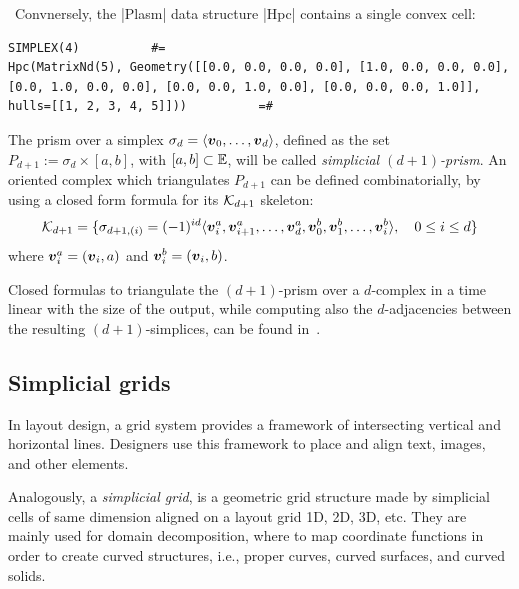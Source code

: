\begin{coding}\ 
Convnersely, the |Plasm| data structure |Hpc| contains a single convex cell:
\begin{lstlisting}[language=JuliaLocal, style=julia, mathescape = true]
SIMPLEX(4)			#=
Hpc(MatrixNd(5), Geometry([[0.0, 0.0, 0.0, 0.0], [1.0, 0.0, 0.0, 0.0], [0.0, 1.0, 0.0, 0.0], [0.0, 0.0, 1.0, 0.0], [0.0, 0.0, 0.0, 1.0]], hulls=[[1, 2, 3, 4, 5]]))			 =#
\end{lstlisting}
\end{coding}

\begin{definition}

The prism over a simplex $\sigma_{d} = \langle {\mbox{\boldmath $v$}}_{0},\ldots,
{\mbox{\boldmath $v$}}_{d} \rangle$, defined as the set $P_{d+1} := \sigma_{d} \times
[a,b]$, with $[a,b]\subset\mathbb{E}$, will be called \emph{simplicial $(d+1)$-prism}. 
An oriented complex which triangulates $P_{d+1}$ can be defined
combinatorially, by using a closed form formula for its ${\cal
K}_{d+1}$ skeleton:
\[
{\cal K}_{d+1} = \{ \sigma_{d+1,(i)} = (-1)^{id}
\langle {\mbox{\boldmath $v$}}_{i}^{a},{\mbox{\boldmath $v$}}_{i+1}^{a},\ldots,{\mbox{\boldmath $v$}}_{d}^{a},
{\mbox{\boldmath $v$}}_{0}^b,{\mbox{\boldmath $v$}}_{1}^b,\ldots,{\mbox{\boldmath $v$}}_{i}^b \rangle, \quad  0\leq i\leq d \}
\]
where ${\mbox{\boldmath $v$}}_{i}^{a} = ({\mbox{\boldmath $v$}}_{i},{a})$ and ${\mbox{\boldmath $v$}}_{i}^{b} = 
({\mbox{\boldmath $v$}}_{i},{b})$.

Closed formulas to triangulate the $(d+1)$-prism over a $d$-complex in
a time linear with the size of the output, while computing also the
$d$-adjacencies between the resulting $(d+1)$-simplices, can be found
in~\cite{10.1016/0010-4485(91)90080-G,10.1145/164360.164376}.
\end{definition}


\subsection*{Simplicial grids}

In layout design, a grid system provides a framework of intersecting vertical and horizontal lines. Designers use this framework to place and align text, images, and other elements. 

Analogously, a \emph{simplicial grid}, is a geometric grid structure made by simplicial cells of same dimension aligned on a layout grid 1D, 2D, 3D, etc.
They are mainly used for domain decomposition, where to map coordinate functions in order to create curved structures, i.e., proper curves, curved surfaces, and curved solids.

